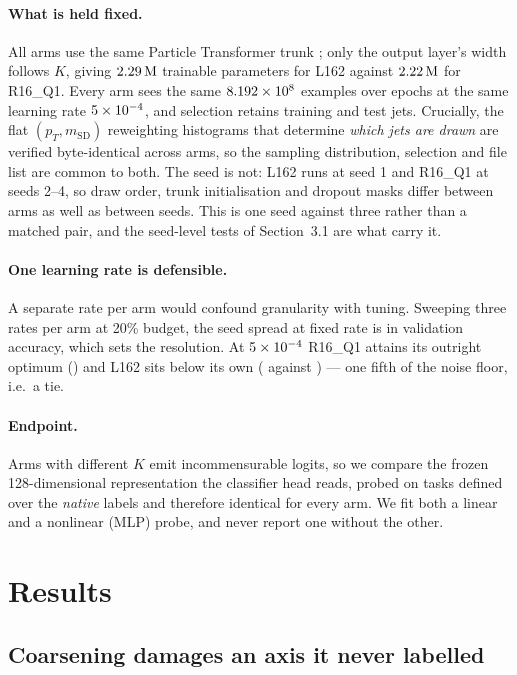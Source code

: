 \documentclass{article}
\begin{document}
\paragraph{What is held fixed.} All arms use the same Particle Transformer
trunk \citep{part}; only the output layer's width follows $K$, giving
$2.29\,\mathrm{M}$ trainable parameters for L162 against $2.22\,\mathrm{M}$ for
R16\_Q1. Every arm sees the same $8.192\times10^{8}$ examples over \Nepochs{} epochs at the
same learning rate $5\times10^{-4}$, and selection retains \Ntrainjets{} training and
\Ntestjets{} test jets. Crucially, the flat $(p_T, m_\mathrm{SD})$ reweighting
histograms that determine \emph{which jets are drawn} are verified byte-identical
across arms, so the sampling distribution, selection and file list are common to
both. The seed is not: L162 runs at seed 1 and R16\_Q1 at seeds 2--4, so draw
order, trunk initialisation and dropout masks differ between arms as well as
between seeds. This is one seed against three rather than a matched pair, and the
seed-level tests of Section~3.1 are what carry it.

\paragraph{One learning rate is defensible.} A separate rate per arm would
confound granularity with tuning. Sweeping three rates per arm at 20\% budget,
the seed spread at fixed rate is \tiemargin{} in validation accuracy, which sets
the resolution. At $5\times10^{-4}$ R16\_Q1 attains its outright optimum (\RsixteenLRb) and
L162 sits \lrgap{} below its own (\LsixtwoLRb{} against \LsixtwoLRc{}) --- one
fifth of the noise floor, i.e.\ a tie.

\paragraph{Endpoint.} Arms with different $K$ emit incommensurable logits, so
we compare the frozen 128-dimensional representation the classifier head reads,
probed on tasks defined over the \emph{native} labels and therefore identical for
every arm. We fit both a linear and a nonlinear (MLP) probe, and never report one
without the other.

\section{Results}

\subsection{Coarsening damages an axis it never labelled}
\end{document}
